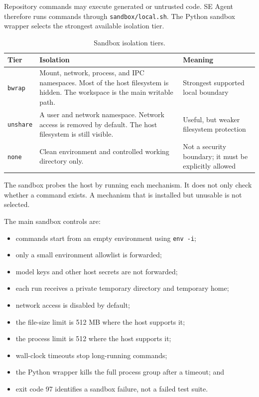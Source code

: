 \documentclass[11pt,a4paper]{article}
\begin{document}
Repository commands may execute generated or untrusted code. SE Agent therefore
runs commands through \texttt{sandbox/local.sh}. The Python sandbox wrapper
selects the strongest available isolation tier.

\begin{table}[H]
\centering
\small
\begin{tabularx}{\textwidth}{L{0.16\textwidth}Y Y}
\toprule
\textbf{Tier} & \textbf{Isolation} & \textbf{Meaning} \\
\midrule
\texttt{bwrap} & Mount, network, process, and IPC namespaces. Most of the host filesystem is hidden. The workspace is the main writable path. & Strongest supported local boundary \\

\texttt{unshare} & A user and network namespace. Network access is removed by default. The host filesystem is still visible. & Useful, but weaker filesystem protection \\

\texttt{none} & Clean environment and controlled working directory only. & Not a security boundary; it must be explicitly allowed \\
\bottomrule
\end{tabularx}
\caption{Sandbox isolation tiers.}
\label{tab:sandbox-tiers}
\end{table}

The sandbox probes the host by running each mechanism. It does not only check
whether a command exists. A mechanism that is installed but unusable is not
selected.

The main sandbox controls are:

\begin{itemize}
  \item commands start from an empty environment using \texttt{env -i};
  \item only a small environment allowlist is forwarded;
  \item model keys and other host secrets are not forwarded;
  \item each run receives a private temporary directory and temporary home;
  \item network access is disabled by default;
  \item the file-size limit is 512 MB where the host supports it;
  \item the process limit is 512 where the host supports it;
  \item wall-clock timeouts stop long-running commands;
  \item the Python wrapper kills the full process group after a timeout; and
  \item exit code 97 identifies a sandbox failure, not a failed test suite.
\end{itemize}
\end{document}
